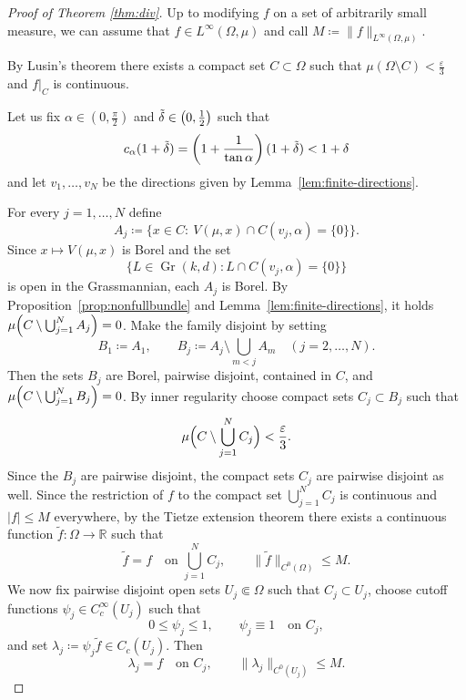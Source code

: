 \documentclass[11pt,a4paper]{article}
\newcommand{\R}{\mathbb{R}}
\newcommand{\Gr}{\operatorname{Gr}}
\theoremstyle{definition}
\theoremstyle{remark}
\begin{document}
\begin{proof}[Proof of Theorem \ref{thm:div}]
Up to modifying $f$ on a set of arbitrarily small measure, we can assume that $f \in L^{\infty}(\Omega,\mu)$ and call $M \coloneqq \|f\|_{L^{\infty}(\Omega,\mu)}$.

By Lusin's theorem there exists a compact set $C\subset \Omega$ such that $\mu(\Omega\setminus C)<\frac{\varepsilon}{3}$ and $f|_C$ is continuous.

Let us fix $\alpha \in \left(0,\frac{\pi}{2}\right)$ and $\Tilde{\delta}\in \left(0,\frac{1}{2}\right)$ such that
\begin{equation}\label{eq:alpha_delta_div}
    c_\alpha (1+\Tilde{\delta}) = \left(1+\frac{1}{\tan \alpha} \right)(1+\Tilde{\delta}) < 1+\delta
\end{equation}
and let $v_1,\dots,v_N$ be the directions given by Lemma~\ref{lem:finite-directions}.

For every $j=1,\dots,N$ define
$$
A_j\coloneqq \bigl\{x\in C:\ V(\mu,x)\cap C(v_j,\alpha)=\{0\}\bigr\}.
$$
Since $x\mapsto V(\mu,x)$ is Borel and the set
$$
\{L\in \Gr(k,d): L\cap C(v_j,\alpha)=\{0\}\}
$$
is open in the Grassmannian, each $A_j$ is Borel.
By Proposition~\ref{prop:nonfullbundle} and Lemma~\ref{lem:finite-directions}, it holds $\mu\Bigl(C\setminus \bigcup_{j=1}^N A_j\Bigr)=0$.
Make the family disjoint by setting
$$
B_1\coloneqq A_1,
\qquad
B_j\coloneqq A_j\setminus \bigcup_{m<j}A_m
\quad(j=2,\dots,N).
$$
Then the sets $B_j$ are Borel, pairwise disjoint, contained in $C$, and $\mu\Bigl(C\setminus \bigcup_{j=1}^N B_j\Bigr)=0$.
By inner regularity choose compact sets $C_j\subset B_j$ such that
$$
\mu\Bigl(C\setminus \bigcup_{j=1}^N C_j\Bigr)<\frac{\varepsilon}{3}.
$$
Since the $B_j$ are pairwise disjoint, the compact sets $C_j$ are pairwise disjoint as well.
Since the restriction of $f$ to the compact set $\bigcup_{j=1}^N C_j$ is continuous and $|f|\le M$ everywhere, by the Tietze extension theorem there exists a continuous function $\widetilde f \colon \Omega\to\R$ such that
$$
\widetilde f=f\quad\text{on }\bigcup_{j=1}^N C_j,
\qquad
\|\widetilde f\|_{C^0(\Omega)}\le M.
$$
We now fix pairwise disjoint open sets $U_j\Subset \Omega$ such that $C_j \subset U_j$, choose cutoff functions $\psi_j\in C^\infty_c(U_j)$ such that
$$
0\le \psi_j\le 1,
\qquad
\psi_j\equiv 1\quad\text{on }C_j,
$$
and set $\lambda_j\coloneqq \psi_j\widetilde f\in C_c(U_j)$. Then
$$
\lambda_j=f \quad\text{on }C_j,
\qquad
\|\lambda_j\|_{C^0(U_j)}\le M.
$$


\end{proof}
\end{document}
